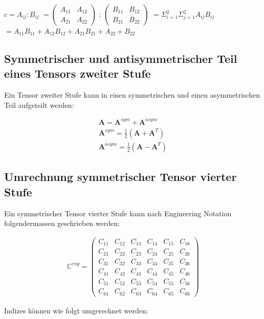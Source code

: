\documentclass[a4paper]{scrartcl}
\begin{document}
$ 
c = A_{ij}:B_{ij} 
$
$
=
\begin{pmatrix}
A_{11} & A_{12} \\ 
A_{21} & A_{22}
\end{pmatrix} 
$
:
$
\begin{pmatrix}
B_{11} & B_{12} \\ 
B_{21} & B_{22}
\end{pmatrix} 
$
$
=\varSigma_{i=1}^{2}\varSigma_{j=1}^{2}A_{ij}B_{ij}
$
$
=A_{11}B_{11}+A_{12}B_{12}+A_{21}B_{21}+A_{22}+B_{22}
$
\subsection{Symmetrischer und antisymmetrischer Teil eines Tensors zweiter
Stufe}

Ein Tensor zweiter Stufe kann in einen symmetrischen und einen asymmetrischen
Teil aufgeteilt werden:

\begin{align}
\mathbf{A}=\mathbf{A}^{sym}+\mathbf{A}^{asym} \\
\mathbf{A}^{sym}=\frac{1}{2}\left(\mathbf{A}+\mathbf{A}^T\right) \\
\mathbf{A}^{asym}=\frac{1}{2}\left(\mathbf{A}-\mathbf{A}^T\right)
\end{align}

\subsection{Umrechnung symmetrischer Tensor vierter Stufe}\label{tensor4th}

Ein symmetrischer Tensor vierter Stufe kann nach Engineering Notation
folgendermassen geschrieben werden:

\begin{align}
\mathbb{C}^{eng}= \begin{pmatrix}
C_{11}&C_{12}&C_{13}&C_{14}&C_{15}&C_{16}\\
C_{21}&C_{22}&C_{23}&C_{24}&C_{25}&C_{26}\\
C_{31}&C_{32}&C_{33}&C_{34}&C_{35}&C_{36}\\
C_{41}&C_{42}&C_{43}&C_{44}&C_{45}&C_{46}\\
C_{51}&C_{52}&C_{53}&C_{54}&C_{55}&C_{56}\\
C_{61}&C_{62}&C_{63}&C_{64}&C_{65}&C_{66}
\end{pmatrix}
\end{align}

Indizes können wie folgt umgerechnet werden:
\end{document}
